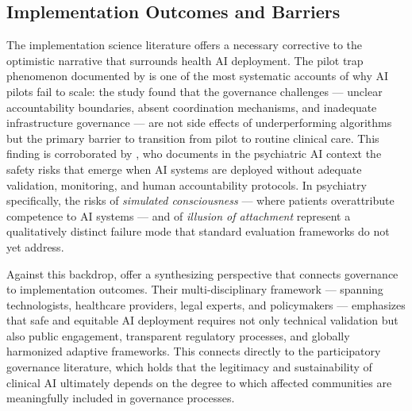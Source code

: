 
\subsection{Implementation Outcomes and Barriers}
\label{sec:implementation}

The implementation science literature offers a necessary corrective to the
optimistic narrative that surrounds health AI deployment. The pilot trap
phenomenon documented by \citet{tian2026pilottrap} is one of the most
systematic accounts of why AI pilots fail to scale: the study found that the
governance challenges — unclear accountability boundaries, absent coordination
mechanisms, and inadequate infrastructure governance — are not side effects
of underperforming algorithms but the primary barrier to transition from pilot
to routine clinical care. This finding is corroborated by \citet{keri2026simulated},
who documents in the psychiatric AI context the safety risks that emerge when
AI systems are deployed without adequate validation, monitoring, and human
accountability protocols. In psychiatry specifically, the risks of
\textit{simulated consciousness} — where patients overattribute competence to
AI systems — and of \textit{illusion of attachment} represent a qualitatively
distinct failure mode that standard evaluation frameworks do not yet address.

Against this backdrop, \citet{pham2025ethical} offer a synthesizing perspective
that connects governance to implementation outcomes. Their multi-disciplinary
framework — spanning technologists, healthcare providers, legal experts, and
policymakers — emphasizes that safe and equitable AI deployment requires not
only technical validation but also public engagement, transparent regulatory
processes, and globally harmonized adaptive frameworks. This connects directly
to the participatory governance literature, which holds that the legitimacy
and sustainability of clinical AI ultimately depends on the degree to which
affected communities are meaningfully included in governance processes.


